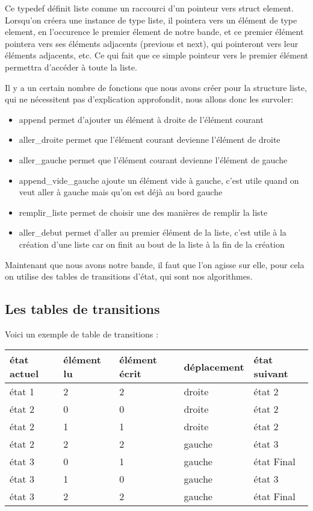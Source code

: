 \documentclass[a4paper,10pt, parskip=true]{scrartcl}
\begin{document}
        Ce typedef définit liste comme un raccourci d'un pointeur vers struct element. Lorsqu'on créera une instance de type liste, il pointera vers un élément de type element, en l'occurence le premier élement de notre bande, et ce premier élément pointera vers ses éléments adjacents (previous et next), qui pointeront vers leur éléments adjacents, etc. Ce qui fait que ce simple pointeur vers le premier élément permettra d'accéder à toute la liste.
        
        
        Il y a un certain nombre de fonctions que nous avons créer pour la structure liste, qui ne nécessitent pas d'explication approfondit, nous allons donc les survoler:
        \begin{itemize}
        \item append permet d'ajouter un élément à droite de l'élément courant
        \item aller\_droite permet que l'élément courant devienne l'élément de droite
        \item aller\_gauche permet que l'élément courant devienne l'élément de gauche
        \item append\_vide\_gauche ajoute un élément vide à gauche, c'est utile quand on veut aller à gauche mais qu'on est déjà au bord gauche
        \item remplir\_liste permet de choisir une des manières de remplir la liste
        \item aller\_debut permet d'aller au premier élément de la liste, c'est utile à la création d'une liste car on finit au bout de la liste à la fin de la création
        \end{itemize}
        
        Maintenant que nous avons notre bande, il faut que l'on agisse sur elle, pour cela on utilise des tables de transitions d'état, qui sont nos algorithmes.
        
    \subsection{Les tables de transitions}

        Voici un exemple de table de transitions : 
        
        \begin{tabular}{|l|l|l|l|l|}
          \hline
          état actuel & élément lu & élément  écrit & déplacement & état suivant\\
          \hline
          état 1 & 2 & 2 & droite & état 2 \\   
          \hline 
          état 2 & 0 & 0 & droite &  état 2 \\
          état 2 & 1 & 1 & droite &  état 2 \\
          état 2 & 2 & 2 & gauche &  état 3 \\
          \hline
          état 3 & 0 & 1 & gauche & état Final \\   
          état 3 & 1 & 0 & gauche & état 3 \\  
          état 3 & 2 & 2 & gauche & état Final \\
          \hline
        \end{tabular}
        
\end{document}
